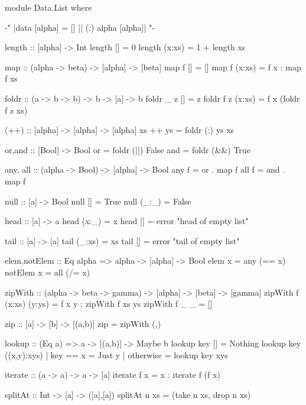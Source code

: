 \begin{code}
module Data.List where

{-" |data [alpha] = [] || (:) alpha [alpha]| "-}

length :: [alpha] -> Int
length []      = 0
length (x:xs)  = 1 + length xs

map :: (alpha -> beta) -> [alpha] -> [beta]
map f []      = []
map f (x:xs)  = f x : map f xs

foldr            :: (a -> b -> b) -> b -> [a] -> b
foldr _ z []     =  z
foldr f z (x:xs) =  f x (foldr f z xs)

(++) :: [alpha] -> [alpha] -> [alpha]
xs ++ ys = foldr (:) ys xs

or,and :: [Bool] -> Bool
or                      =  foldr (||) False
and                     =  foldr (&&) True

any, all :: (alpha -> Bool) -> [alpha] -> Bool
any  f = or   . map f
all  f = and  . map f

null                    :: [a] -> Bool
null []                 =  True
null (_:_)              =  False

head                    :: [a] -> a
head (x:_)              =  x
head []                 =  error "head of empty list"

tail                    :: [a] -> [a]
tail (_:xs)             =  xs
tail []                 =  error "tail of empty list"

elem,notElem :: Eq alpha => alpha -> [alpha] -> Bool
elem x = any (== x)
notElem x = all (/= x)

zipWith :: (alpha -> beta -> gamma) -> [alpha] -> [beta] -> [gamma]
zipWith f (x:xs) (y:ys) = f x y : zipWith f xs ys
zipWith f _ _ = []

zip :: [a] -> [b] -> [(a,b)]
zip = zipWith (,)

lookup :: (Eq a) => a -> [(a,b)] -> Maybe b
lookup key []           =  Nothing
lookup key ((x,y):xys)  | key == x   = Just y
                        | otherwise  = lookup key xys

iterate :: (a -> a) -> a -> [a]
iterate f x =  x : iterate f (f x)

splitAt                :: Int -> [a] -> ([a],[a])
splitAt n xs           =  (take n xs, drop n xs)


\end{code}

